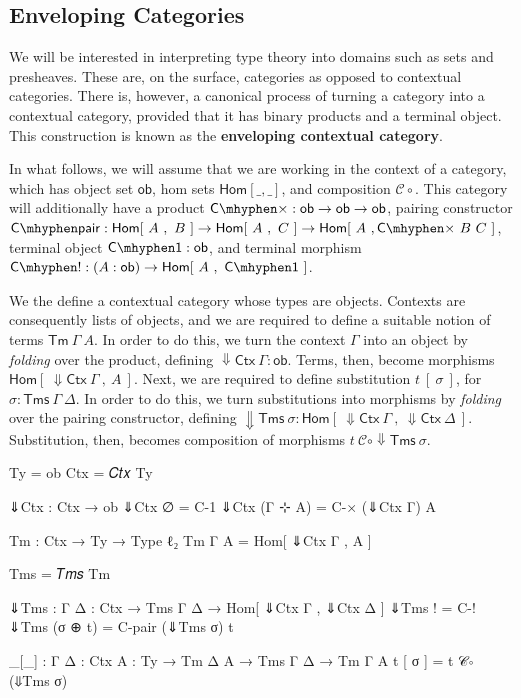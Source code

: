 \subsection{Enveloping Categories}

We will be interested in interpreting type theory into domains such as sets and
presheaves. These are, on the surface, categories as opposed to contextual
categories. There is, however, a canonical process of turning a category into a
contextual category, provided that it has binary products and a terminal object.
This construction is known as the \textbf{enveloping contextual category}.

\clearpage

In what follows, we will assume that we are working in the context of a
category, which has object set $\mathsf{ob}$, hom sets $\mathsf{Hom}[\_,\_]$,
and composition $\mathcal{C}\circ$. This category will additionally have a
product $\mathsf{C\mhyphen\times} : \mathsf{ob} \to \mathsf{ob} \to
\mathsf{ob}$, pairing constructor $\mathsf{C\mhyphen pair} : \mathsf{Hom}[~A~,
~B~] \to \mathsf{Hom}[~A~,~C~] \to \mathsf{Hom}[~A~,\mathsf{C\mhyphen\times}~B
~C~]$, terminal object $\mathsf{C\mhyphen 1} : \mathsf{ob}$, and terminal
morphism $\mathsf{C\mhyphen !} : (A : \mathsf{ob}) \to \mathsf{Hom}[~A~,
~\mathsf{C\mhyphen 1}~]$.

We the define a contextual category whose types are objects. Contexts are
consequently lists of objects, and we are required to define a suitable notion
of terms $\mathsf{Tm}~\Gamma~A$. In order to do this, we turn the context
$\Gamma$ into an object by \emph{folding} over the product, defining $\Downarrow
\!\!\mathsf{Ctx}~\Gamma : \mathsf{ob}$. Terms, then, become morphisms
$\mathsf{Hom}[~\Downarrow\!\!\mathsf{Ctx}~\Gamma~,~A~]$. Next, we are required
to define substitution $t~[~\sigma~]$, for $\sigma : \mathsf{Tms}~\Gamma~
\Delta$. In order to do this, we turn substitutions into morphisms by
\emph{folding} over the pairing constructor, defining $\Downarrow\!\!
\mathsf{Tms}~\sigma : \mathsf{Hom} [~\Downarrow\!\!\mathsf{Ctx}~\Gamma~,
~\Downarrow\!\!\mathsf{Ctx} ~\Delta~]$. Substitution, then, becomes composition
of morphisms $t~\mathcal{C} \circ \Downarrow\!\!\mathsf{Tms}~\sigma$.

\begin{code}
  Ty = ob
  Ctx = 𝐶𝑡𝑥 Ty

  ⇓Ctx : Ctx → ob
  ⇓Ctx ∅ = C-1
  ⇓Ctx (Γ ⊹ A) = C-× (⇓Ctx Γ) A

  Tm : Ctx → Ty → Type ℓ₂
  Tm Γ A = Hom[ ⇓Ctx Γ , A ]

  Tms = 𝑇𝑚𝑠 Tm

  ⇓Tms : {Γ Δ : Ctx} → Tms Γ Δ → Hom[ ⇓Ctx Γ , ⇓Ctx Δ ]
  ⇓Tms ! = C-!
  ⇓Tms (σ ⊕ t) = C-pair (⇓Tms σ) t

  _[_] : {Γ Δ : Ctx} {A : Ty} → Tm Δ A → Tms Γ Δ → Tm Γ A
  t [ σ ] = t 𝒞∘ (⇓Tms σ)
\end{code}

